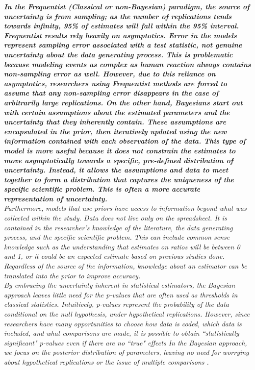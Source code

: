 \documentclass{article}
\begin{document}
\textit{\textbf{In the Frequentist (Classical or non-Bayesian) paradigm, the source of uncertainty is from sampling; as the number of replications tends towards infinity, 95\% of estimates will fall within the 95\% interval. Frequentist results rely heavily on asymptotics. Error in the models represent sampling error associated with a test statistic, not genuine uncertainty about the data generating process. This is problematic because modeling events as complex as human reaction always contains non-sampling error as well. However, due to this reliance on asymptotics, researchers using Frequentist methods are forced to assume that any non-sampling error disappears in the case of arbitrarily large replications. On the other hand, Bayesians start out with certain assumptions about the estimated parameters and the uncertainty that they inherently contain. These assumptions are encapsulated in the prior, then iteratively updated using the new information contained with each observation of the data. This type of model is more useful because it does not constrain the estimates to move asymptotically towards a specific, pre-defined distribution of uncertainty. Instead, it allows the assumptions and data to meet together to form a distribution that captures the uniqueness of the specific scientific problem. This is often a more accurate representation of uncertainty.}}\\

\textit{Furthermore, models that use priors have access to information beyond what was collected within the study. Data does not live only on the spreadsheet. It is contained in the researcher's knowledge of the literature, the data generating process, and the specific scientific problem. This can include common sense knowledge such as the understanding that estimates on ratios will be between 0 and 1, or it could be an expected estimate based on previous studies done. Regardless of the source of the information, knowledge about an estimator can be translated into the prior to improve accuracy. \\ 
By embracing the uncertainty inherent in statistical estimators, the Bayesian approach leaves little need for the p-values that are often used as thresholds in classical statistics.  Intuitively, p-values represent the probability of the data conditional on the null hypothesis, under hypothetical replications.  However, since researchers have many opportunities to choose how data is coded, which data is included, and what comparisons are made, it is possible to obtain ``statistically significant" p-values even if there are no ``true" effects \cite{gelman2013commentary}  In the Bayesian approach, we focus on the posterior distribution of parameters, leaving no need for worrying about hypothetical replications or the issue of multiple comparisons \cite{gelman2014bayesian}. }
\end{document}
